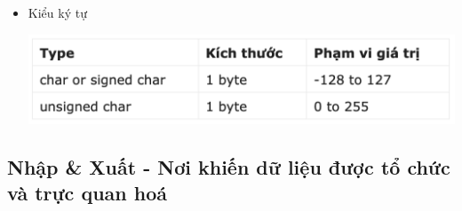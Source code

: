 \documentclass[12pt,a4paper]{article}
\begin{document}
\begin{center}
\begin{itemize}
\item Kiểu ký tự 
\begin{center}
\includegraphics[scale = 0.7]{kieukytu}
\end{center}
\end{itemize}	
\end{center}

\subsection{Nhập \& Xuất - Nơi khiến dữ liệu được tổ chức và trực quan hoá}
\end{document}
